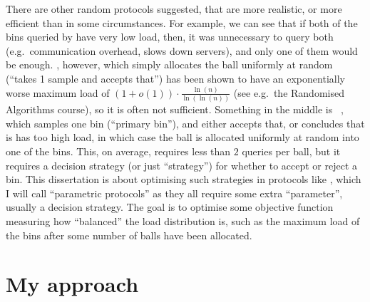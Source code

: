 There are other random protocols suggested, that are more realistic, or more efficient than \TwoChoice in some circumstances. For example, we can see that if both of the bins queried by \TwoChoice have very low load, then, it was unnecessary to query both (e.g.\ communication overhead, slows down servers), and only one of them would be enough. \OneChoice, however, which simply allocates the ball uniformly at random (``takes 1 sample and accepts that'') has been shown to have an exponentially worse maximum load of $(1+o(1))\cdot \frac{\ln(n)}{\ln(\ln(n))}$ (see e.g.\ the Randomised Algorithms course), so it is often not sufficient. Something in the middle is \TwoThinning~\cite{feldheim2021thinning}, which samples one bin (``primary bin''), and either accepts that, or concludes that is has too high load, in which case the ball is allocated uniformly at random into one of the bins. This, on average, requires less than $2$ queries per ball, but it requires a decision strategy (or just ``strategy'') for whether to accept or reject a bin. This dissertation is about optimising such strategies in protocols like \TwoThinning, which I will call ``parametric protocols'' as they all require some extra ``parameter'', usually a decision strategy. The goal is to optimise some objective function measuring how ``balanced'' the load distribution is, such as the maximum load of the bins after some number of balls have been allocated.


\section{My approach}

